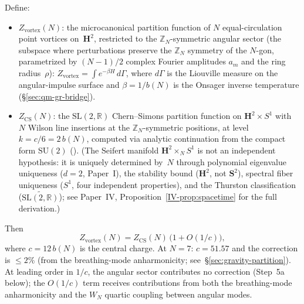 \begin{derivation}
\label{thm:partition-equality}
Define:
\begin{itemize}
\item $Z_{\mathrm{vortex}}(N)$: the microcanonical partition
  function of $N$ equal-circulation point vortices on~$\mathbf{H}^2$,
  restricted to the $\mathbb{Z}_N$-symmetric angular sector
  (the subspace where perturbations preserve the $\mathbb{Z}_N$
  symmetry of the $N$-gon, parametrized by $(N{-}1)/2$ complex
  Fourier amplitudes $a_m$ and the ring radius~$\rho$):
  $Z_{\mathrm{vortex}} = \int
  e^{-\beta H}\,d\Gamma$, where $d\Gamma$ is the Liouville
  measure on the angular-impulse surface and $\beta = 1/b(N)$
  is the Onsager inverse temperature
  (\S\ref{sec:qm-gr-bridge}).
\item $Z_{\mathrm{CS}}(N)$: the $\mathrm{SL}(2,\mathbb{R})$
  Chern--Simons partition function on
  $\mathbf{H}^2 \times S^1$ with $N$ Wilson line insertions
  at the $\mathbb{Z}_N$-symmetric positions,
  at level $k = c/6 = 2\,b(N)$,
  computed via analytic continuation from the compact form
  $\mathrm{SU}(2)$ (\citealt{Witten1991}).
  (The Seifert manifold $\mathbf{H}^2 \times_N S^1$
  is not an independent hypothesis: it is uniquely
  determined by~$N$ through
  polynomial eigenvalue uniqueness ($d = 2$, Paper~I),
  the stability bound ($\mathbf{H}^2$, not $\mathbf{S}^2$),
  spectral fiber uniqueness ($S^1$, four independent
  properties), and the Thurston classification
  ($\widetilde{\mathrm{SL}(2,\mathbb{R})}$);
  see Paper~IV, Proposition~\ref*{IV-prop:spacetime}
  for the full derivation.)
\end{itemize}
Then
\begin{equation}\label{eq:Z-equality}
  Z_{\mathrm{vortex}}(N)
  = Z_{\mathrm{CS}}(N)\,\bigl(1 + O(1/c)\bigr),
\end{equation}
where $c = 12\,b(N)$ is the central charge.
At $N = 7$: $c = 51.57$ and the correction is
$\le 2\%$ (from the breathing-mode anharmonicity;
see~\S\ref{sec:gravity-partition}).
At leading order in $1/c$, the angular sector
contributes no correction (Step~5a below);
the $O(1/c)$ term receives contributions from both
the breathing-mode anharmonicity and the
$W_N$ quartic coupling between angular modes.
\end{derivation}

